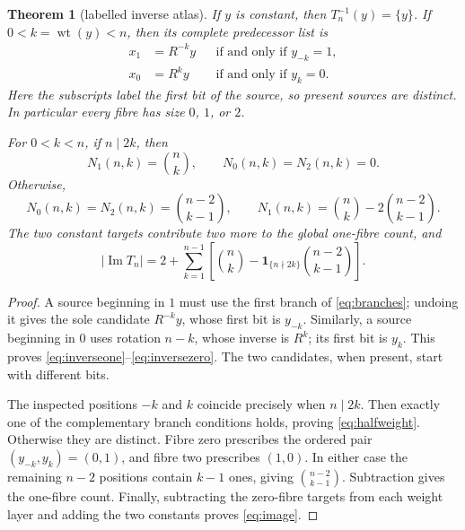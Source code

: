 \documentclass[a4paper,10pt]{amsart}
\newtheorem{theorem}{Theorem}[section]
\theoremstyle{remark}
\newcommand{\wt}{\operatorname{wt}}
\newcommand{\Imap}{\operatorname{Im}}
\newcommand{\1}{\mathbf 1}
\begin{document}
\begin{theorem}[labelled inverse atlas]\label{thm:fibres}
If $y$ is constant, then $T_n^{-1}(y)=\{y\}$.  If $0<k=\wt(y)<n$, then its
complete predecessor list is
\begin{align}
 x_1&=R^{-k}y &&\text{if and only if }y_{-k}=1,\label{eq:inverseone}\\
 x_0&=R^{k}y  &&\text{if and only if }y_k=0.\label{eq:inversezero}
\end{align}
Here the subscripts label the first bit of the source, so present sources
are distinct.  In particular every fibre has size $0$, $1$, or $2$.

For $0<k<n$, if $n\mid2k$, then
\begin{equation}\label{eq:halfweight}
 N_1(n,k)=\binom nk,\qquad N_0(n,k)=N_2(n,k)=0.
\end{equation}
Otherwise,
\begin{equation}\label{eq:fibrehist}
 N_0(n,k)=N_2(n,k)=\binom{n-2}{k-1},\qquad
 N_1(n,k)=\binom nk-2\binom{n-2}{k-1}.
\end{equation}
The two constant targets contribute two more to the global one-fibre
count, and
\begin{equation}\label{eq:image}
 |\Imap T_n|=2+\sum_{k=1}^{n-1}
 \left[\binom nk-
 \mathbf1_{\{n\nmid2k\}}\binom{n-2}{k-1}\right].
\end{equation}
\end{theorem}

\begin{proof}
A source beginning in $1$ must use the first branch of
\eqref{eq:branches}; undoing it gives the sole candidate $R^{-k}y$, whose
first bit is $y_{-k}$.  Similarly, a source beginning in $0$ uses rotation
$n-k$, whose inverse is $R^k$; its first bit is $y_k$.  This proves
\eqref{eq:inverseone}--\eqref{eq:inversezero}.  The two candidates, when
present, start with different bits.

The inspected positions $-k$ and $k$ coincide precisely when $n\mid2k$.
Then exactly one of the complementary branch conditions holds, proving
\eqref{eq:halfweight}.  Otherwise they are distinct.  Fibre zero prescribes
the ordered pair $(y_{-k},y_k)=(0,1)$, and fibre two prescribes $(1,0)$.
In either case the remaining $n-2$ positions contain $k-1$ ones, giving
$\binom{n-2}{k-1}$.  Subtraction gives the one-fibre count.  Finally,
subtracting the zero-fibre targets from each weight layer and adding the two
constants proves \eqref{eq:image}.
\end{proof}
\end{document}
